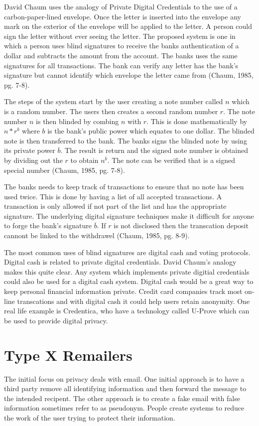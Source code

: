 \documentclass[12pt]{article}
\begin{document}
David Chaum uses the analogy of Private Digital Credentials to the use of a carbon-paper-lined envelope. Once the letter is inserted into the envelope any mark on the exterior of the envelope will be applied to the letter. A person could sign the letter without ever seeing the letter. The proposed system is one in which a person uses blind signatures to receive the banks authentication of a dollar and subtracts the amount from the account. The banks uses the same signatures for all transactions. The bank can verify any letter has the bank's signature but cannot identify which envelope the letter came from (Chaum, 1985, pg. 7-8).

The steps of the system start by the user creating a note number called $n$ which is a random number. The users then creates a second random number  $r$. The note number $n$ is then blinded by combing $n$ with $r$. This is done mathematically by $n * r^b$ where $b$ is the bank's public power which equates to one dollar. The blinded note is then transferred to the bank. The banks signs the blinded note by using its private power $\overline{b}$. The result is return and the signed note number is obtained by dividing out the $r$ to obtain $n^{\overline{b}}$. The note can be verified that is a signed special number (Chaum, 1985, pg. 7-8).

The banks needs to keep track of transactions to ensure that no note has been used twice. This is done by having a list of all accepted transactions. A transaction is only allowed if not part of the list and has the appropriate signature. The underlying digital signature techniques make it difficult for anyone to forge the bank's signature $\overline{b}$. If $r$ is not disclosed then the transcation deposit cannont be linked to the withdrawel (Chaum, 1985, pg. 8-9).

The most common uses of blind signatures are digital cash and voting protocols. Digital cash is related to private digital credentials. David Chaum's analogy makes this quite clear. Any system which implements private digitial credentials could also be used for a digital cash system. Digital cash would be a great way to keep personal financial information private. Credit card companies track most on-line transcations and with digital cash it could help users retain anonymity. One real life example is Credentica, who have a technology called U-Prove which can be used to provide digital privacy.

\section{Type X Remailers}\label{sec:type-x}
The initial focus on privacy deals with email. One initial approach is to have a third party remove all identifying information and then forward the message to the intended recipent. The other approach is to create a fake email with false information sometimes refer to as pseudonym. People create systems to reduce the work of the user trying to protect their information.
\end{document}
